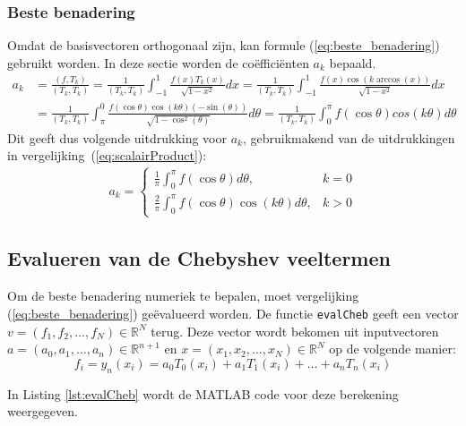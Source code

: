 \documentclass[a4paper, 12pt, titlepage, fleqn]{article}
\begin{document}
\subsubsection{Beste benadering}
Omdat de basisvectoren orthogonaal zijn, kan formule (\ref{eq:beste_benadering}) gebruikt worden. In deze sectie worden de co\"effici\"enten $a_k$ bepaald.
\begin{align*}
a_k &= \frac{(f,T_k)}{(T_k,T_k)} = \frac{1}{(T_k,T_k)}\int_{-1}^1\frac{f(x)T_k(x)}{\sqrt{1-x^2}}dx = \frac{1}{(T_k,T_k)}\int_{-1}^1\frac{f(x)\cos(k \arccos(x))}{\sqrt{1-x^2}}dx\\
&= \frac{1}{(T_k,T_k)}\int_\pi^0\frac{f(\cos \theta)\cos(k\theta)(-\sin(\theta))}{\sqrt{1-\cos^2(\theta)}}d\theta = \frac{1}{(T_k,T_k)}\int_0^\pi f(\cos \theta) cos(k\theta)d\theta
\end{align*}
Dit geeft dus volgende uitdrukking voor $a_k$, gebruikmakend van de uitdrukkingen in vergelijking~(\ref{eq:scalairProduct}):
\begin{align}
a_k = \begin{cases}
\frac{1}{\pi}\int_0^\pi f(\cos \theta)d\theta, & k = 0\\
\frac{2}{\pi}\int_0^\pi f(\cos \theta)\cos(k\theta)d\theta, & k > 0
\end{cases}
\label{eq:a_K}
\end{align}



\subsection{Evalueren van de Chebyshev veeltermen}
Om de beste benadering numeriek te bepalen, moet vergelijking (\ref{eq:beste_benadering}) ge\"evalueerd worden. De functie \texttt{evalCheb} geeft een vector $v = (f_1, f_2, \ldots, f_N) \in \mathbb{R}^N$ terug. Deze vector wordt bekomen uit inputvectoren $a = (a_0,a_1,\ldots, a_n) \in \mathbb{R}^{n+1}$ en $x = (x_1,x_2,\ldots,x_N) \in \mathbb{R}^N$ op de volgende manier:
\begin{equation*}
f_i = y_n(x_i) = a_0T_0(x_i) + a_1T_1(x_i) + \ldots + a_nT_n(x_i)
\end{equation*}

In Listing \ref{lst:evalCheb} wordt de MATLAB code voor deze berekening weergegeven.


\end{document}
